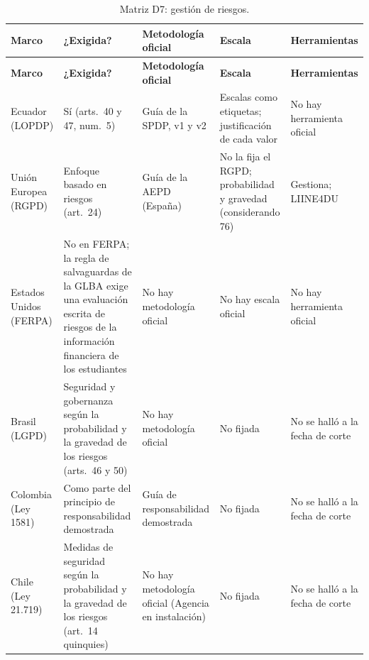{\scriptsize
\renewcommand{\arraystretch}{1.12}
\begin{xltabular}{\textwidth}{|>{\raggedright\arraybackslash}p{2.0cm}|L|L|L|L|}
  \caption{Matriz D7: gestión de riesgos.}
  \label{tab:matriz_d7} \\
  \hline
  \textbf{Marco} & \textbf{¿Exigida?} & \textbf{Metodología oficial} & \textbf{Escala} & \textbf{Herramientas} \\
  \hline
  \endfirsthead
  \hline
  \textbf{Marco} & \textbf{¿Exigida?} & \textbf{Metodología oficial} & \textbf{Escala} & \textbf{Herramientas} \\
  \hline
  \endhead
  \hline
  \endlastfoot
  Ecuador (LOPDP) & Sí (arts.~40 y 47, num.~5) & Guía de la SPDP, v1 y v2 \cite{spdp2025guia,spdp2026guiav2} & Escalas como etiquetas; justificación de cada valor \cite{spdp2026guiav2} & No hay herramienta oficial \\ \hline
  Unión Europea (RGPD) & Enfoque basado en riesgos (art.~24) \cite{rgpd2016} & Guía de la AEPD (España) \cite{aepd2021riesgo} & No la fija el RGPD; probabilidad y gravedad (considerando 76) & Gestiona; LIINE4DU \cite{aepd2024gestiona,aepd2024liine4du} \\ \hline
  Estados Unidos (FERPA) & No en FERPA; la regla de salvaguardas de la GLBA exige una evaluación escrita de riesgos de la información financiera de los estudiantes \cite{ftc2021safeguards,fsa2023glba} & No hay metodología oficial & No hay escala oficial & No hay herramienta oficial \\ \hline
  Brasil (LGPD) & Seguridad y gobernanza según la probabilidad y la gravedad de los riesgos (arts.~46 y 50) & No hay metodología oficial & No fijada & No se halló a la fecha de corte \\ \hline
  Colombia (Ley 1581) & Como parte del principio de responsabilidad demostrada \cite{sic2015accountability} & Guía de responsabilidad demostrada \cite{sic2015accountability} & No fijada & No se halló a la fecha de corte \\ \hline
  Chile (Ley 21.719) & Medidas de seguridad según la probabilidad y la gravedad de los riesgos (art.~14 quinquies) & No hay metodología oficial (Agencia en instalación) & No fijada & No se halló a la fecha de corte \\ \hline
\end{xltabular}
}

